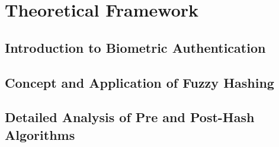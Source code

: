 \section{Theoretical Framework}

\subsection{Introduction to Biometric Authentication}

\subsection{Concept and Application of Fuzzy Hashing}

\subsection{Detailed Analysis of Pre and Post-Hash Algorithms}
